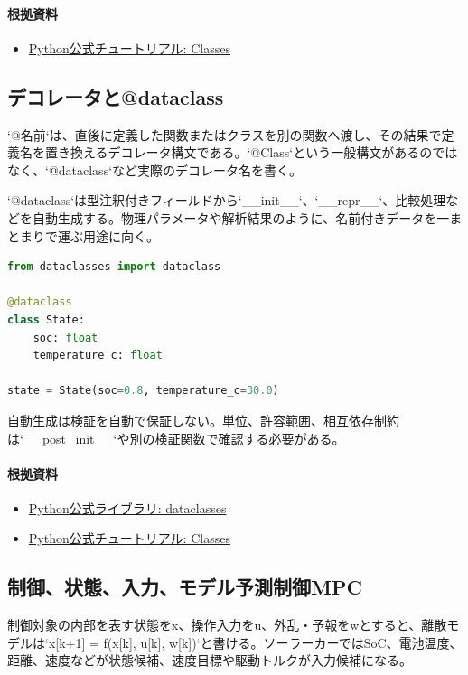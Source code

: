 \documentclass[a4paper,11pt]{article}
\begin{document}
\paragraph{根拠資料}
\begin{itemize}[leftmargin=1.6em]
\item \href{https://docs.python.org/3/tutorial/classes.html}{Python公式チュートリアル: Classes}
\end{itemize}

\subsection{デコレータと@dataclass}
`@名前`は、直後に定義した関数またはクラスを別の関数へ渡し、その結果で定義名を置き換えるデコレータ構文である。`@Class`という一般構文があるのではなく、`@dataclass`など実際のデコレータ名を書く。


`@dataclass`は型注釈付きフィールドから`\_\_init\_\_`、`\_\_repr\_\_`、比較処理などを自動生成する。物理パラメータや解析結果のように、名前付きデータを一まとまりで運ぶ用途に向く。


\begin{lstlisting}[language=python]
from dataclasses import dataclass

@dataclass
class State:
    soc: float
    temperature_c: float

state = State(soc=0.8, temperature_c=30.0)
\end{lstlisting}


自動生成は検証を自動で保証しない。単位、許容範囲、相互依存制約は`\_\_post\_init\_\_`や別の検証関数で確認する必要がある。

\paragraph{根拠資料}
\begin{itemize}[leftmargin=1.6em]
\item \href{https://docs.python.org/3/library/dataclasses.html}{Python公式ライブラリ: dataclasses}
\item \href{https://docs.python.org/3/tutorial/classes.html}{Python公式チュートリアル: Classes}
\end{itemize}

\subsection{制御、状態、入力、モデル予測制御MPC}
制御対象の内部を表す状態をx、操作入力をu、外乱・予報をwとすると、離散モデルは`x[k+1] = f(x[k], u[k], w[k])`と書ける。ソーラーカーではSoC、電池温度、距離、速度などが状態候補、速度目標や駆動トルクが入力候補になる。
\end{document}
